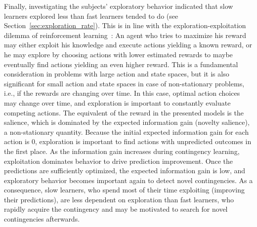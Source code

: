 \documentclass[a4paper]{scrreprt}
\begin{document}
Finally, investigating the subjects' exploratory behavior indicated that slow learners explored less than fast learners tended to do (see Section~\ref{sec:exploration_rate}). This is in line with the exploration-exploitation dilemma of reinforcement learning~\cite{sutton98}: An agent who tries to maximize his reward may either exploit his knowledge and execute actions yielding a known reward, or he may explore by choosing actions with lower estimated rewards to maybe eventually find actions yielding an even higher reward. This is a fundamental consideration in problems with large action and state spaces, but it is also significant for small action and state spaces in case of non-stationary problems, i.e., if the rewards are changing over time. In this case, optimal action choices may change over time, and exploration is important to constantly evaluate competing actions. The equivalent of the reward in the presented models is the salience, which is dominated by the expected information gain (novelty salience), a non-stationary quantity. Because the initial expected information gain for each action is 0, exploration is important to find actions with unpredicted outcomes in the first place. As the information gain increases during contingency learning, exploitation dominates behavior to drive prediction improvement. Once the predictions are sufficiently optimized, the expected information gain is low, and exploratory behavior becomes important again to detect novel contingencies. As a consequence, slow learners, who spend most of their time exploiting (improving their predictions), are less dependent on exploration than fast learners, who rapidly acquire the contingency and may be motivated to search for novel contingencies afterwards.
\end{document}
